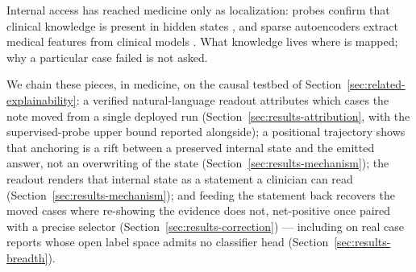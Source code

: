Internal access has reached medicine only as localization: probes confirm
that clinical knowledge is present in hidden states
\cite{adrprobing2025, alignmentresistant2025}, and sparse autoencoders
extract medical features from clinical models \cite{jmirsae2026, ehrsae2026}.
What knowledge lives where is mapped; why a particular case failed is not
asked.

We chain these pieces, in medicine, on the causal testbed of
Section~\ref{sec:related-explainability}: a verified natural-language
readout attributes which cases the note moved from a single deployed run
(Section~\ref{sec:results-attribution}, with the supervised-probe upper
bound reported alongside); a positional trajectory shows that anchoring is
a rift between a preserved internal state and the emitted answer, not an
overwriting of the state (Section~\ref{sec:results-mechanism}); the readout
renders that internal state as a statement a clinician can read
(Section~\ref{sec:results-mechanism}); and feeding the statement back
recovers the moved cases where re-showing the evidence does not,
net-positive once paired with a precise selector
(Section~\ref{sec:results-correction}) --- including on real case reports
whose open label space admits no classifier head
(Section~\ref{sec:results-breadth}).

